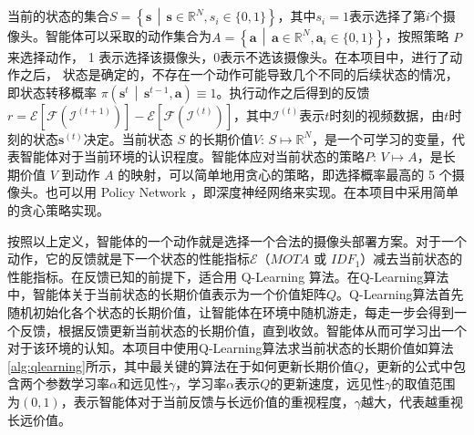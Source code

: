 当前的状态的集合$S=\left\{\boldsymbol{s}\,\middle\vert\,\boldsymbol{s}\in\mathbb{R}^{N}, s_i\in\{0, 1\}\right\}$，其中$s_i=1$表示选择了第$i$个摄像头。智能体可以采取的动作集合为$A=\left\{\boldsymbol{a}\,\middle\vert\,\boldsymbol{a}\in\mathbb{R}^N,\boldsymbol{a}_i \in \{0,1\}\right\}$，按照策略 $P$ 来选择动作， 1 表示选择该摄像头，0表示不选该摄像头。在本项目中，进行了动作之后， 状态是确定的，不存在一个动作可能导致几个不同的后续状态的情况，即状态转移概率 $\pi\left(\boldsymbol{s}^t\,\middle\vert\,\boldsymbol{s}^{t-1}, \boldsymbol{a}\right)\equiv1$。执行动作之后得到的反馈$r=\mathcal{E}\left[\mathcal{F}\left(\mathcal{I}^{(t+1)}\right)\right]-\mathcal{E}\left[\mathcal{F}\left(\mathcal{I}^{(t)}\right)\right]$，其中$\mathcal{I}^{(t)}$表示$t$时刻的视频数据，由$t$时刻的状态$\boldsymbol{s}^{(t)}$决定。当前状态 $S$ 的长期价值$V:\,S\mapsto\mathbb{R}^N$，是一个可学习的变量，代表智能体对于当前环境的认识程度。智能体应对当前状态的策略$P:\,V\mapsto A$，是长期价值 $V$ 到动作 $A$ 的映射，可以简单地用贪心的策略，即选择概率最高的 5 个摄像头。也可以用 Policy Network ，即深度神经网络来实现。在本项目中采用简单的贪心策略实现。

按照以上定义，智能体的一个动作就是选择一个合法的摄像头部署方案。对于一个动作，它的反馈就是下一个状态的性能指标$\mathcal{E}$（$\mathit{MOTA}$ 或 $\mathit{IDF_1}$）减去当前状态的性能指标。在反馈已知的前提下，适合用 Q-Learning\cite{watkins1989learning} 算法。在Q-Learning算法中，智能体关于当前状态的长期价值表示为一个价值矩阵$Q$。Q-Learning算法首先随机初始化各个状态的长期价值，让智能体在环境中随机游走，每走一步会得到一个反馈，根据反馈更新当前状态的长期价值，直到收敛。智能体从而可学习出一个对于该环境的认知。本项目中使用Q-Learning算法求当前状态的长期价值如算法\ref{alg:qlearning}所示，其中最关键的算法在于如何更新长期价值$Q$，更新的公式中包含两个参数学习率$\alpha$和远见性$\gamma$，学习率$\alpha$表示$Q$的更新速度，远见性$\gamma$的取值范围为$(0, 1)$，表示智能体对于当前反馈与长远价值的重视程度，$\gamma$越大，代表越重视长远价值。


